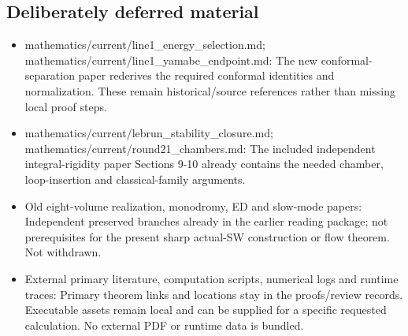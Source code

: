 \documentclass[
  10pt,
]{article}
\providecommand{\tightlist}{%
  \setlength{\itemsep}{0pt}\setlength{\parskip}{0pt}}
\begin{document}
\hypertarget{deliberately-deferred-material}{%
\subsection{Deliberately deferred
material}\label{deliberately-deferred-material}}

\begin{itemize}
\tightlist
\item
  mathematics/current/line1\_energy\_selection.md;
  mathematics/current/line1\_yamabe\_endpoint.md: The new
  conformal-separation paper rederives the required conformal identities
  and normalization. These remain historical/source references rather
  than missing local proof steps.
\item
  mathematics/current/lebrun\_stability\_closure.md;
  mathematics/current/round21\_chambers.md: The included independent
  integral-rigidity paper Sections 9-10 already contains the needed
  chamber, loop-insertion and classical-family arguments.
\item
  Old eight-volume realization, monodromy, ED and slow-mode papers:
  Independent preserved branches already in the earlier reading package;
  not prerequisites for the present sharp actual-SW construction or flow
  theorem. Not withdrawn.
\item
  External primary literature, computation scripts, numerical logs and
  runtime traces: Primary theorem links and locations stay in the
  proofs/review records. Executable assets remain local and can be
  supplied for a specific requested calculation. No external PDF or
  runtime data is bundled.
\end{itemize}
\end{document}
